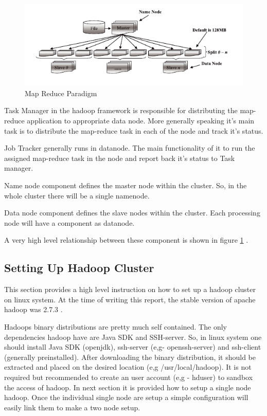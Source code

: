 \documentclass{article}
\begin{document}
\begin{figure}[h]
	\centering
	\includegraphics[width=\textwidth]{hadoop-hdfs}
	\caption{Map Reduce Paradigm}
	\label{fig:hdfs}
\end{figure}

Task Manager in the hadoop framework is responsible for distributing the map-reduce application to appropriate data node. More generally speaking it’s main task is to distribute the map-reduce task in each of the node and track it’s status.

Job Tracker generally runs in datanode. The main functionality of it to run the assigned map-reduce task in the node and report back it’s status to Task manager.

Name node component defines the master node within the cluster. So, in the whole cluster there will be a single namenode.

Data node component defines the slave nodes within the cluster. Each processing node will have a component as datanode.

A very high level relationship between these component is shown in figure \ref{fig:hdfs} \cite{c452017}.

\subsection{Setting Up Hadoop Cluster}
This section provides a high level instruction on how to set up a hadoop cluster on linux system. At the time of writing this report, the stable version of apache hadoop was 2.7.3 \cite{hadoopap}. 

Hadoops binary distributions are pretty much self contained. The only dependencies hadoop have are Java SDK and SSH-server. So, in linux system one should install Java SDK (openjdk), ssh-server (e,g- openssh-server) and ssh-client (generally preinstalled). After downloading the binary distribution, it should be extracted and placed on the desired location (e,g /usr/local/hadoop). It is not required but recommended to create an user account (e,g - hduser) to sandbox the access of hadoop. In next section it is provided how to setup a single node hadoop. Once the individual single node are setup a simple configuration will easily link them to make a two node setup.
\end{document}
